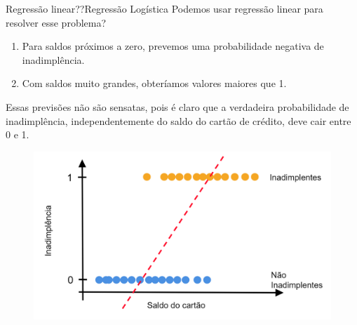 \documentclass[t]{beamer}
\begin{document}

\begin{ftst}{Regressão linear??}{Regressão Logística}
\small
Podemos usar regressão linear para resolver esse problema? 

\begin{enumerate}
    \item Para saldos próximos a zero, prevemos uma probabilidade negativa de inadimplência.
    \item Com saldos muito grandes, obteríamos valores maiores que 1.
\end{enumerate} 

Essas previsões não são sensatas, pois é claro que a verdadeira probabilidade de inadimplência, independentemente do saldo do cartão de crédito, deve cair entre 0 e 1. 

\begin{figure}
    \centering
    \includegraphics[scale=0.125]{Figuras/slide05_06.png}
\end{figure}

\end{ftst}

\end{document}
